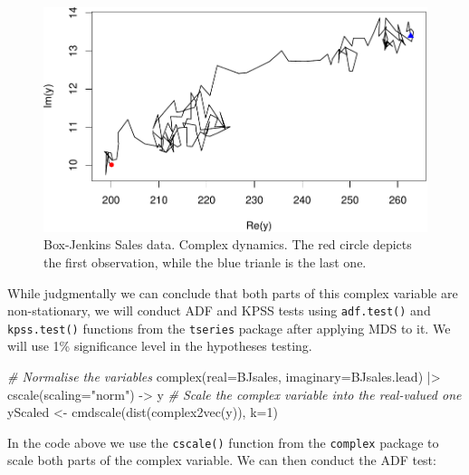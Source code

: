 \documentclass[
]{book}
\newenvironment{Shaded}{\begin{snugshade}}{\end{snugshade}}
\newcommand{\AttributeTok}[1]{\textcolor[rgb]{0.77,0.63,0.00}{#1}}
\newcommand{\CommentTok}[1]{\textcolor[rgb]{0.56,0.35,0.01}{\textit{#1}}}
\newcommand{\DecValTok}[1]{\textcolor[rgb]{0.00,0.00,0.81}{#1}}
\newcommand{\FunctionTok}[1]{\textcolor[rgb]{0.00,0.00,0.00}{#1}}
\newcommand{\NormalTok}[1]{#1}
\newcommand{\OtherTok}[1]{\textcolor[rgb]{0.56,0.35,0.01}{#1}}
\newcommand{\SpecialCharTok}[1]{\textcolor[rgb]{0.00,0.00,0.00}{#1}}
\newcommand{\StringTok}[1]{\textcolor[rgb]{0.31,0.60,0.02}{#1}}
\begin{document}
\begin{figure}
\centering
\includegraphics{Svetunkov---Svetunkov---Complex-Valued-Econometrics_files/figure-latex/BJSalesComplex-1.pdf}
\caption{\label{fig:BJSalesComplex}Box-Jenkins Sales data. Complex dynamics. The red circle depicts the first observation, while the blue trianle is the last one.}
\end{figure}

While judgmentally we can conclude that both parts of this complex variable are non-stationary, we will conduct ADF and KPSS tests using \texttt{adf.test()} and \texttt{kpss.test()} functions from the \texttt{tseries} package after applying MDS to it. We will use 1\% significance level in the hypotheses testing.

\begin{Shaded}
\begin{Highlighting}[]
\CommentTok{\# Normalise the variables}
\FunctionTok{complex}\NormalTok{(}\AttributeTok{real=}\NormalTok{BJsales, }\AttributeTok{imaginary=}\NormalTok{BJsales.lead) }\SpecialCharTok{|\textgreater{}}
    \FunctionTok{cscale}\NormalTok{(}\AttributeTok{scaling=}\StringTok{"norm"}\NormalTok{) }\OtherTok{{-}\textgreater{}}\NormalTok{ y}
\CommentTok{\# Scale the complex variable into the real{-}valued one}
\NormalTok{yScaled }\OtherTok{\textless{}{-}} \FunctionTok{cmdscale}\NormalTok{(}\FunctionTok{dist}\NormalTok{(}\FunctionTok{complex2vec}\NormalTok{(y)), }\AttributeTok{k=}\DecValTok{1}\NormalTok{)}
\end{Highlighting}
\end{Shaded}

In the code above we use the \texttt{cscale()} function from the \texttt{complex} package to scale both parts of the complex variable. We can then conduct the ADF test:
\end{document}
